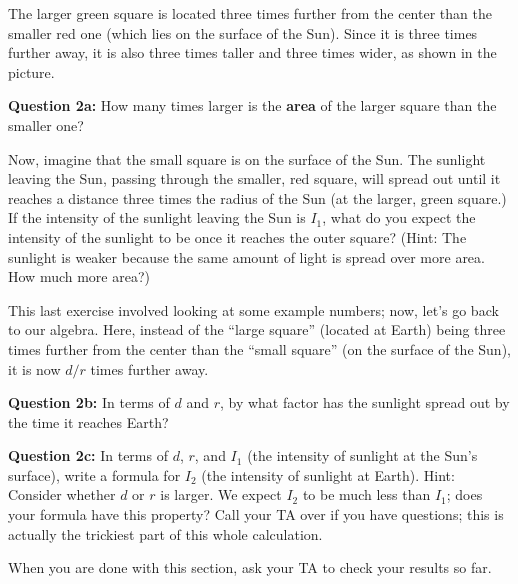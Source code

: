 \documentclass[11pt]{article}
\begin{document}
The larger green square is located three times further from the center than the smaller red one (which lies on the surface of the Sun). Since it is three times further away, it is also
three times taller and three times wider, as shown in the picture.

{\bf Question 2a:} How many times larger is the {\bf area} of the larger square than the smaller one?

\vspace*{2cm}

\hrulefill
\newpage
Now, imagine that the small square is on the surface of the Sun. The sunlight leaving the Sun, passing through the smaller, red square, 
will spread out until it reaches a distance three times 
the radius of the Sun (at the larger, green square.) If the intensity of the sunlight leaving the Sun is $I_1$, what do you expect the intensity of the sunlight to be once it reaches 
the outer square? (Hint: The sunlight is weaker because the same amount of light is spread over more area. How much more area?)

\vspace*{5cm}

\hrulefill

This last exercise involved looking at some example numbers; now, let's go back to our algebra. Here, instead of the ``large square'' (located at Earth) being three times further from the 
center than the ``small square'' (on the surface of the Sun), it is now $d/r$ times further away.


{\bf Question 2b:} In terms of $d$ and $r$, by what factor has the sunlight spread out by the time it reaches Earth?

\vspace*{5cm}

\hrulefill
\newpage
{\bf Question 2c:} In terms of $d$, $r$, and $I_1$ (the intensity of sunlight at the Sun's surface), write a formula for $I_2$ (the intensity of sunlight at Earth). 
Hint: Consider whether $d$ or $r$ is larger.
We expect $I_2$ to be much less than $I_1$; does your formula have this property? Call your TA over if you have questions; this is actually the trickiest part of this whole calculation.

\vspace*{5cm}

\hrulefill

When you are done with this section, ask your TA to check your results so far.



\bigskip
\bigskip
\end{document}
